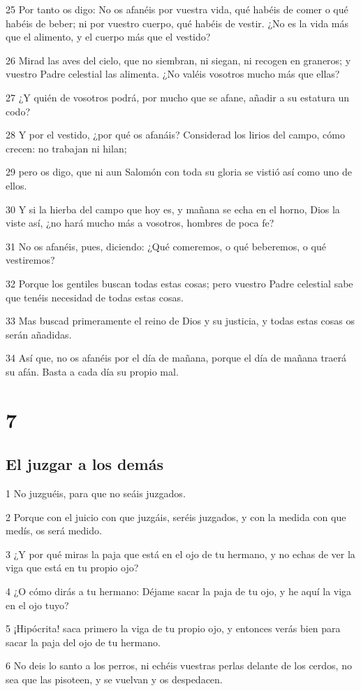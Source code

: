 \par 25 Por tanto os digo: No os afanéis por vuestra vida, qué habéis de comer o qué habéis de beber; ni por vuestro cuerpo, qué habéis de vestir. ¿No es la vida más que el alimento, y el cuerpo más que el vestido?
\par 26 Mirad las aves del cielo, que no siembran, ni siegan, ni recogen en graneros; y vuestro Padre celestial las alimenta. ¿No valéis vosotros mucho más que ellas?
\par 27 ¿Y quién de vosotros podrá, por mucho que se afane, añadir a su estatura un codo?
\par 28 Y por el vestido, ¿por qué os afanáis? Considerad los lirios del campo, cómo crecen: no trabajan ni hilan;
\par 29 pero os digo, que ni aun Salomón con toda su gloria se vistió así como uno de ellos.
\par 30 Y si la hierba del campo que hoy es, y mañana se echa en el horno, Dios la viste así, ¿no hará mucho más a vosotros, hombres de poca fe?
\par 31 No os afanéis, pues, diciendo: ¿Qué comeremos, o qué beberemos, o qué vestiremos?
\par 32 Porque los gentiles buscan todas estas cosas; pero vuestro Padre celestial sabe que tenéis necesidad de todas estas cosas.
\par 33 Mas buscad primeramente el reino de Dios y su justicia, y todas estas cosas os serán añadidas.
\par 34 Así que, no os afanéis por el día de mañana, porque el día de mañana traerá su afán. Basta a cada día su propio mal.

\chapter{7}

\section*{El juzgar a los demás}

\par 1 No juzguéis, para que no seáis juzgados.
\par 2 Porque con el juicio con que juzgáis, seréis juzgados, y con la medida con que medís, os será medido.
\par 3 ¿Y por qué miras la paja que está en el ojo de tu hermano, y no echas de ver la viga que está en tu propio ojo?
\par 4 ¿O cómo dirás a tu hermano: Déjame sacar la paja de tu ojo, y he aquí la viga en el ojo tuyo?
\par 5 ¡Hipócrita! saca primero la viga de tu propio ojo, y entonces verás bien para sacar la paja del ojo de tu hermano.
\par 6 No deis lo santo a los perros, ni echéis vuestras perlas delante de los cerdos, no sea que las pisoteen, y se vuelvan y os despedacen.

